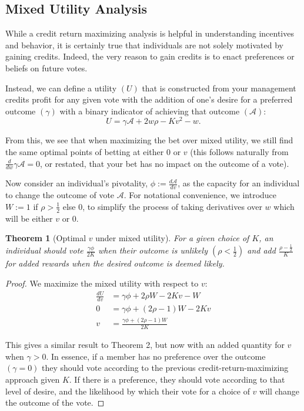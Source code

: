 \documentclass{article}
\newtheorem{theorem}{Theorem}[section]
\begin{document}
\subsection{Mixed Utility Analysis}
While a credit return maximizing analysis is helpful in understanding incentives and behavior, it is certainly true that individuals are not solely motivated by gaining credits. Indeed, the very reason to gain credits is to enact preferences or beliefs on future votes.

Instead, we can define a utility $(U)$ that is constructed from your management credits profit for any given vote with the addition of one's desire for a preferred outcome $(\gamma)$ with a binary indicator of achieving that outcome $(\mathcal{A})$:
\[ U = \gamma \mathcal{A} + 2 w \rho - K v^2 - w. \]

From this, we see that when maximizing the bet over mixed utility, we still find the same optimal points of betting at either 0 or $v$ (this follows naturally from $\frac{d}{dw} \gamma \mathcal{A} = 0$, or restated, that your bet has no impact on the outcome of a vote).

Now consider an individual's pivotality, $\phi := \frac{d \mathcal{A}}{dv}$, as the capacity for an individual to change the outcome of vote $\mathcal{A}$. For notational convenience, we introduce $W := 1$ if $\rho > \frac{1}{2}$ else 0, to simplify the process of taking derivatives over $w$ which will be either $v$ or 0.

\begin{theorem}[Optimal $v$ under mixed utility]
For a given choice of $K$, an individual should vote $\frac{\gamma \phi}{2 K}$ when their outcome is unlikely $\left( \rho < \frac{1}{2} \right)$ and add $\frac{\rho - \frac{1}{2}}{K}$ for added rewards when the desired outcome is deemed likely.
\end{theorem}

\begin{proof}
We maximize the mixed utility with respect to $v$:
\[
\begin{aligned}
\frac{d U}{dv} &= \gamma \phi + 2 \rho W - 2 K v - W \\
0 &= \gamma \phi + (2 \rho - 1) W - 2 K v \\
v &= \frac{\gamma \phi + (2 \rho - 1) W}{2 K}
\end{aligned}
\]

This gives a similar result to Theorem 2, but now with an added quantity for $v$ when $\gamma > 0$. In essence, if a member has no preference over the outcome $(\gamma = 0)$ they should vote according to the previous credit-return-maximizing approach given $K$. If there is a preference, they should vote according to that level of desire, and the likelihood by which their vote for a choice of $v$ will change the outcome of the vote.
\end{proof}
\end{document}
